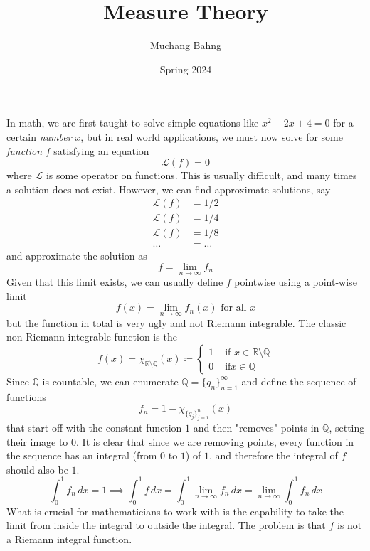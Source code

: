\documentclass{article}
\begin{document}
\title{Measure Theory}
\author{Muchang Bahng}
\date{Spring 2024}

\maketitle
\tableofcontents
\pagebreak

In math, we are first taught to solve simple equations like $x^2 - 2x + 4 = 0$ for a certain \textit{number} $x$, but in real world applications, we must now solve for some \textit{function} $f$ satisfying an equation 
\[\mathcal{L}(f) = 0\]
where $\mathcal{L}$ is some operator on functions. This is usually difficult, and many times a solution does not exist. However, we can find approximate solutions, say 
\begin{align*}
    \mathcal{L}(f) & = 1/2 \\
    \mathcal{L}(f) & = 1/4 \\ 
    \mathcal{L}(f) & = 1/8 \\
    \ldots & = \ldots 
\end{align*}
and approximate the solution as 
\[f = \lim_{n \rightarrow \infty} f_n \]
Given that this limit exists, we can usually define $f$ pointwise using a point-wise limit 
\[f(x) = \lim_{n \rightarrow \infty} f_n (x) \text{ for all } x\]
but the function in total is very ugly and not Riemann integrable. The classic non-Riemann integrable function is the 
\[f(x) = \chi_{\mathbb{R} \setminus \mathbb{Q}} (x) \coloneqq \begin{cases} 
1 & \text{ if } x \in \mathbb{R} \setminus \mathbb{Q} \\
0 & \text{ if} x \in \mathbb{Q} 
\end{cases}\]
Since $\mathbb{Q}$ is countable, we can enumerate $\mathbb{Q} = \{q_n\}_{n=1}^\infty$ and define the sequence of functions 
\[f_n = 1 - \chi_{\{q_j\}_{j=1}^n}(x)\]
that start off with the constant function $1$ and then "removes" points in $\mathbb{Q}$, setting their image to $0$. It is clear that since we are removing points, every function in the sequence has an integral (from $0$ to $1$) of $1$, and therefore the integral of $f$ should also be $1$. 
\[\int_0^1 f_n \, dx = 1 \implies \int_0^1 f \,dx = \int_0^1 \lim_{n \rightarrow \infty} f_n \,dx = \lim_{n \rightarrow \infty} \int_0^1 f_n \,dx\]
What is crucial for mathematicians to work with is the capability to take the limit from inside the integral to outside the integral. The problem is that $f$ is not a Riemann integral function. 
\end{document}
